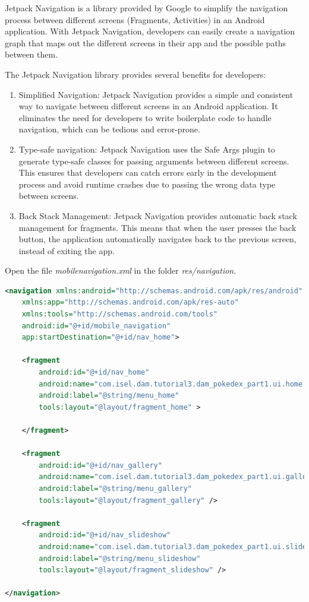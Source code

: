\documentclass[a4paper, 12pt]{article}
\begin{document}
Jetpack Navigation is a library provided by Google to simplify the navigation process between different screens (Fragments, Activities) in an Android application. With Jetpack Navigation, developers can easily create a navigation graph that maps out the different screens in their app and the possible paths between them.

The Jetpack Navigation library provides several benefits for developers:

\begin{enumerate}
    \item Simplified Navigation: Jetpack Navigation provides a simple and consistent way to navigate between different screens in an Android application. It eliminates the need for developers to write boilerplate code to handle navigation, which can be tedious and error-prone.

    \item Type-safe navigation: Jetpack Navigation uses the Safe Args plugin to generate type-safe classes for passing arguments between different screens. This ensures that developers can catch errors early in the development process and avoid runtime crashes due to passing the wrong data type between screens.
    
    \item Back Stack Management: Jetpack Navigation provides automatic back stack management for fragments. This means that when the user presses the back button, the application automatically navigates back to the previous screen, instead of exiting the app.
 
\end{enumerate}


Open the file \textit{mobilenavigation.xml} in the folder \textit{res/navigation}.

\begin{lstlisting}[caption={Navigation Code.}, label={code:nav_code}, language=XML]
	<navigation xmlns:android="http://schemas.android.com/apk/res/android"
    xmlns:app="http://schemas.android.com/apk/res-auto"
    xmlns:tools="http://schemas.android.com/tools"
    android:id="@+id/mobile_navigation"
    app:startDestination="@+id/nav_home">

    <fragment
        android:id="@+id/nav_home"
        android:name="com.isel.dam.tutorial3.dam_pokedex_part1.ui.home.HomeFragment"
        android:label="@string/menu_home"
        tools:layout="@layout/fragment_home" >

    </fragment>

    <fragment
        android:id="@+id/nav_gallery"
        android:name="com.isel.dam.tutorial3.dam_pokedex_part1.ui.gallery.GalleryFragment"
        android:label="@string/menu_gallery"
        tools:layout="@layout/fragment_gallery" />

    <fragment
        android:id="@+id/nav_slideshow"
        android:name="com.isel.dam.tutorial3.dam_pokedex_part1.ui.slideshow.SlideshowFragment"
        android:label="@string/menu_slideshow"
        tools:layout="@layout/fragment_slideshow" />
   
</navigation>
\end{lstlisting}
\end{document}

